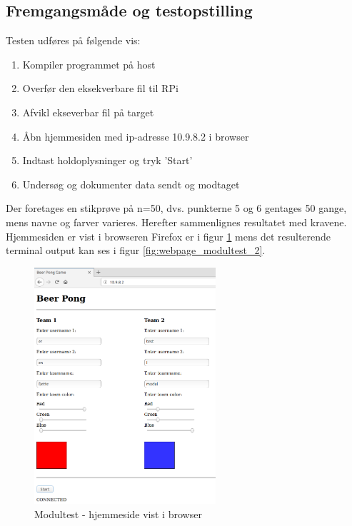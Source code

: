 \documentclass[Modultest/Modultest_main.tex]{subfiles}
\begin{document}
\subsection{Fremgangsmåde og testopstilling}
Testen udføres på følgende vis:
\begin{enumerate}
    \item Kompiler programmet på host
    \item Overfør den eksekverbare fil til RPi 
    \item Afvikl ekseverbar fil på target
    \item Åbn hjemmesiden med ip-adresse 10.9.8.2 i browser
    \item Indtast holdoplysninger og tryk 'Start'
    \item Undersøg og dokumenter data sendt og modtaget
\end{enumerate}
Der foretages en stikprøve på n=50, dvs. punkterne 5 og 6 gentages 50 gange, mens navne og farver varieres. Herefter sammenlignes resultatet med kravene.
Hjemmesiden er vist i browseren Firefox er i figur \ref{fig:webpage_modultest_1} mens det resulterende terminal output kan ses i figur \ref{fig:webpage_modultest_2}.
\begin{figure}[H]
    \centering
    \includegraphics[width=0.6\textwidth]{Modultest/WebPage/graphics/modultest_1.png}
    \caption{Modultest - hjemmeside vist i browser}
    \label{fig:webpage_modultest_1}
\end{figure}
\end{document}
